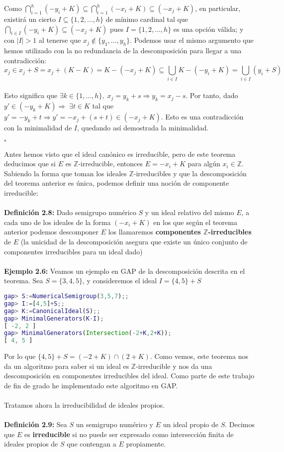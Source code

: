 \documentclass[11pt,spanish]{book}
\newcommand{\qed}{\begin{flushright} $\square$ \end{flushright}}
\begin{document}
Como $\bigcap_{i=1}^{h} (-y_{i}+K)\subseteq \bigcap_{i=1}^{h} (-x_{i}+K)\subseteq (-x_{j}+K)$, en particular, existirá un cierto $I\subseteq \{1,2,\ldots,h\}$ de mínimo cardinal tal que $\bigcap_{i\in I} (-y_{i}+K)\subseteq (-x_{j}+K)$ pues $I=\{1,2,\ldots,h\}$ es una opción válida; y con $|I|>1$ al tenerse que $x_{j}\notin \{y_{1},\ldots,y_{h}\}$. Podemos usar el mismo argumento que hemos utilizado con la no redundancia de la descomposición para llegar a una contradicción:
$$x_{j}\in x_{j}+S = x_{j} + (K-K) = K-(-x_{j}+K)\subseteq \bigcup_{i\in I} K-(-y_{i}+K)=\bigcup_{i\in I}(y_{i}+S)$$\\

Esto significa que $\exists k\in\{1,\ldots,h\},\;x_{j}=y_{k}+s\Rightarrow y_{k}=x_{j}-s$. Por tanto, dado $y'\in (-y_{k}+K)\Rightarrow \;\exists t\in K$ tal que $y'=-y_{k}+t\Rightarrow y'=-x_{j}+(s+t)\in (-x_{j}+K)$. Esto es una contradicción con la minimalidad de $I$, quedando así demostrada la minimalidad.
\qed

Antes hemos visto que el ideal canónico es irreducible, pero de este teorema deducimos que si $E$ es $\mathbb{Z}$-irreducible, entonces $E=-x_{i}+K$ para algún $x_{i}\in \mathbb{Z}$. Sabiendo la forma que toman los ideales $\mathbb{Z}$-irreducibles y que la descomposición del teorema anterior es única, podemos definir una noción de componente irreducible:\\
\\ \textbf{Definición 2.8: } Dado semigrupo numérico $S$ y un ideal relativo del mismo $E$, a cada uno de los ideales de la forma $(-x_{i}+K)$ en los que según el teorema anterior podemos descomponer $E$ los llamaremos \textbf{componentes $\mathbb{Z}$-irreducibles} de $E$ (la unicidad de la descomposición asegura que existe un único conjunto de componentes irreducibles para un ideal dado)\\
\\ \textbf{Ejemplo 2.6: } Veamos un ejemplo en GAP de la descomposición descrita en el teorema. Sea $S = \{3, 4, 5\}$, y consideremos el ideal  $I=\{4,5\}+S$
\begin{lstlisting}[language=gap]
gap> S:=NumericalSemigroup(3,5,7);;
gap> I:=[4,5]+S;;
gap> K:=CanonicalIdeal(S);;
gap> MinimalGenerators(K-I);
[ -2, 2 ]
gap> MinimalGenerators(Intersection(-2+K,2+K));
[ 4, 5 ]
\end{lstlisting}

Por lo que $\{4,5\}+S = (-2 + K) \cap (2 + K)$. Como vemos, este teorema nos da un algoritmo para saber si un ideal es $\mathbb{Z}$-irreducible y nos da una descomposición en componentes irreducibles del ideal. Como parte de este trabajo de fin de grado he implementado este algoritmo en GAP.\\ \\
Tratamos ahora la irreducibilidad de ideales propios.\\
\\ \textbf{Definición 2.9: } Sea $S$ un semigrupo numérico y $E$ un ideal propio de $S$. Decimos que $E$ es \textbf{irreducible} si no puede ser expresado como intersección finita de ideales propios de $S$ que contengan a $E$ propiamente.\\
\end{document}
